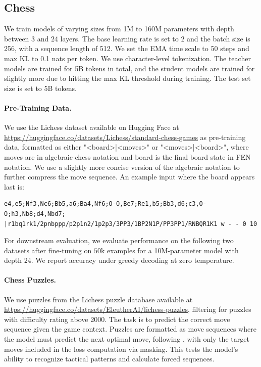 \documentclass[twoside]{article}
\begin{document}
\subsection{Chess}\label{app:chess}
We train models of varying sizes from 1M to 160M parameters with depth between $3$ and $24$ layers. The base learning rate is set to $2$ and the batch size is 256, with a sequence length of 512. We set the EMA time scale to 50 steps and max KL to 0.1 nats per token. We use character-level tokenization. The teacher models are trained for 5B tokens in total, and the student models are trained for slightly more due to hitting the max KL threshold during training. The test set size is set to $5$B tokens.

\paragraph{Pre-Training Data.} We use the Lichess dataset available on Hugging Face at \url{https://huggingface.co/datasets/Lichess/standard-chess-games} as pre-training data, formatted as either "<board>|<moves>" or "<moves>|<board>", where moves are in algebraic chess notation and board is the final board state in FEN notation. We use a slightly more concise version of the algebraic notation to further compress the move sequence. An example input where the board appears last is:
\begin{verbatim}
e4,e5;Nf3,Nc6;Bb5,a6;Ba4,Nf6;O-O,Be7;Re1,b5;Bb3,d6;c3,O-O;h3,Nb8;d4,Nbd7;
|r1bq1rk1/2pnbppp/p2p1n2/1p2p3/3PP3/1BP2N1P/PP3PP1/RNBQR1K1 w - - 0 10
\end{verbatim}


For downstream evaluation, we evaluate performance on the following two datasets after fine-tuning on $50$k examples for a 10M-parameter model with depth 24. We report accuracy under greedy decoding at zero temperature. 
\paragraph{Chess Puzzles.} We use puzzles from the Lichess puzzle database available at \url{https://huggingface.co/datasets/EleutherAI/lichess-puzzles}, filtering for puzzles with difficulty rating above 2000. The task is to predict the correct move sequence given the game context. Puzzles are formatted as move sequences where the model must predict the next optimal move, following \citep{burns2023weak}, with only the target moves included in the loss computation via masking. This tests the model's ability to recognize tactical patterns and calculate forced sequences.
\end{document}
